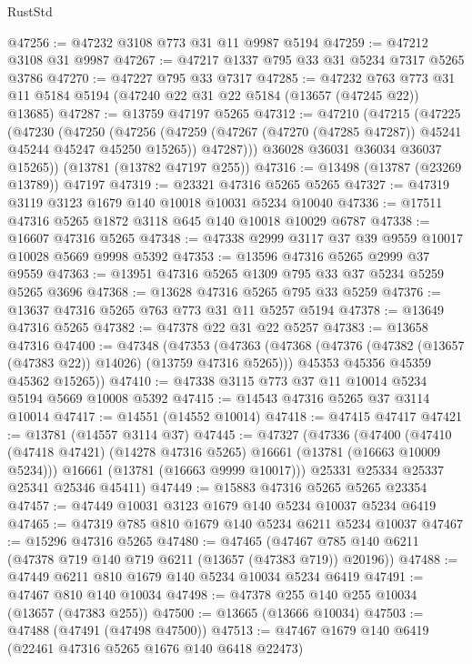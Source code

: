 \begin{lexlean}{RustStd}
\begin{coremodule}
@47256 := @47232 @3108 @773 @31 @11 @9987 @5194
@47259 := @47212 @3108 @31 @9987
@47267 := @47217 @1337 @795 @33 @31 @5234 @7317 @5265 @3786
@47270 := @47227 @795 @33 @7317
@47285 := @47232
    @763
    @773
    @31
    @11
    @5184
    @5194
    (@47240 @22 @31 @22 @5184 (@13657 (@47245 @22)) @13685)
@47287 := @13759 @47197 @5265
@47312 := @47210
    (@47215
      (@47225
        (@47230
          (@47250
            (@47256
              (@47259 (@47267 (@47270 (@47285 @47287)) @45241 @45244 @45247 @45250 @15265))
              @47287)))
        @36028
        @36031
        @36034
        @36037
        @15265))
    (@13781 (@13782 @47197 @255))
@47316 := @13498 (@13787 (@23269 @13789)) @47197
@47319 := @23321 @47316 @5265 @5265
@47327 := @47319 @3119 @3123 @1679 @140 @10018 @10031 @5234 @10040
@47336 := @17511 @47316 @5265 @1872 @3118 @645 @140 @10018 @10029 @6787
@47338 := @16607 @47316 @5265
@47348 := @47338 @2999 @3117 @37 @39 @9559 @10017 @10028 @5669 @9998 @5392
@47353 := @13596 @47316 @5265 @2999 @37 @9559
@47363 := @13951 @47316 @5265 @1309 @795 @33 @37 @5234 @5259 @5265 @3696
@47368 := @13628 @47316 @5265 @795 @33 @5259
@47376 := @13637 @47316 @5265 @763 @773 @31 @11 @5257 @5194
@47378 := @13649 @47316 @5265
@47382 := @47378 @22 @31 @22 @5257
@47383 := @13658 @47316
@47400 := @47348
    (@47353
      (@47363
        (@47368 (@47376 (@47382 (@13657 (@47383 @22)) @14026) (@13759 @47316 @5265)))
        @45353
        @45356
        @45359
        @45362
        @15265))
@47410 := @47338 @3115 @773 @37 @11 @10014 @5234 @5194 @5669 @10008 @5392
@47415 := @14543 @47316 @5265 @37 @3114 @10014
@47417 := @14551 (@14552 @10014)
@47418 := @47415 @47417
@47421 := @13781 (@14557 @3114 @37)
@47445 := @47327
    (@47336
      (@47400
        (@47410 (@47418 @47421) (@14278 @47316 @5265) @16661 (@13781 (@16663 @10009 @5234)))
        @16661
        (@13781 (@16663 @9999 @10017)))
      @25331
      @25334
      @25337
      @25341
      @25346
      @45411)
@47449 := @15883 @47316 @5265 @5265 @23354
@47457 := @47449 @10031 @3123 @1679 @140 @5234 @10037 @5234 @6419
@47465 := @47319 @785 @810 @1679 @140 @5234 @6211 @5234 @10037
@47467 := @15296 @47316 @5265
@47480 := @47465
    (@47467 @785 @140 @6211 (@47378 @719 @140 @719 @6211 (@13657 (@47383 @719)) @20196))
@47488 := @47449 @6211 @810 @1679 @140 @5234 @10034 @5234 @6419
@47491 := @47467 @810 @140 @10034
@47498 := @47378 @255 @140 @255 @10034 (@13657 (@47383 @255))
@47500 := @13665 (@13666 @10034)
@47503 := @47488 (@47491 (@47498 @47500))
@47513 := @47467 @1679 @140 @6419 (@22461 @47316 @5265 @1676 @140 @6418 @22473)

\end{coremodule}
\end{lexlean}
